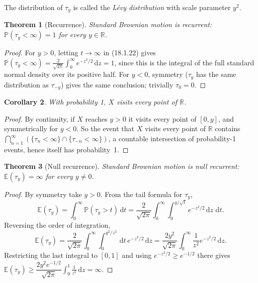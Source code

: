 \documentclass[12pt,openany]{book}
\newtheorem{theorem}{Theorem}[section]
\newtheorem{corollary}[theorem]{Corollary}
\theoremstyle{definition}
\theoremstyle{remark}
\newcommand{\R}{\mathbb{R}}
\newcommand{\E}{\mathbb{E}}
\newcommand{\Prob}{\mathbb{P}}
\newcommand{\dd}{\,\mathrm{d}}
\begin{document}
The distribution of $\tau_y$ is called the \emph{L\'evy distribution} with scale parameter $y^2$.
 
\begin{theorem}[Recurrence]
Standard Brownian motion is \emph{recurrent}: $\Prob(\tau_y<\infty)=1$ for every $y \in \R$.
\end{theorem}
\begin{proof}
For $y>0$, letting $t \to \infty$ in (18.1.22) gives $\Prob(\tau_y<\infty) = \frac{2}{\sqrt{2\pi}}\int_0^\infty e^{-z^2/2}\dd z = 1$, since this is the integral of the full standard normal density over its positive half. For $y<0$, symmetry ($\tau_y$ has the same distribution as $\tau_{-y}$) gives the same conclusion; trivially $\tau_0=0$.
\end{proof}
 
\begin{corollary}
With probability 1, $X$ visits every point of $\R$.
\end{corollary}
\begin{proof}
By continuity, if $X$ reaches $y>0$ it visits every point of $[0,y]$, and symmetrically for $y<0$. So the event that $X$ visits every point of $\R$ contains $\bigcap_{n=1}^\infty (\{\tau_n<\infty\}\cap\{\tau_{-n}<\infty\})$, a countable intersection of probability-1 events, hence itself has probability~1.
\end{proof}
 
\begin{theorem}[Null recurrence]
Standard Brownian motion is \emph{null recurrent}: $\E(\tau_y) = \infty$ for every $y \ne 0$.
\end{theorem}
\begin{proof}
By symmetry take $y>0$. From the tail formula for $\tau_y$,
\begin{equation}
    \E(\tau_y) = \int_0^\infty \Prob(\tau_y>t)\dd t = \frac{2}{\sqrt{2\pi}}\int_0^\infty\int_0^{y/\sqrt t} e^{-z^2/2}\dd z\, \dd t. \tag{18.1.24}
\end{equation}
Reversing the order of integration,
\begin{equation}
    \E(\tau_y) = \frac{2}{\sqrt{2\pi}}\int_0^\infty\int_0^{y^2/z^2} \dd t\, e^{-z^2/2}\dd z = \frac{2y^2}{\sqrt{2\pi}}\int_0^\infty \frac{1}{z^2} e^{-z^2/2}\dd z. \tag{18.1.25}
\end{equation}
Restricting the last integral to $[0,1]$ and using $e^{-z^2/2}\ge e^{-1/2}$ there gives $\E(\tau_y) \ge \dfrac{2y^2 e^{-1/2}}{\sqrt{2\pi}}\displaystyle\int_0^1 \frac{1}{z^2}\dd z = \infty$.
\end{proof}
 
\end{document}
